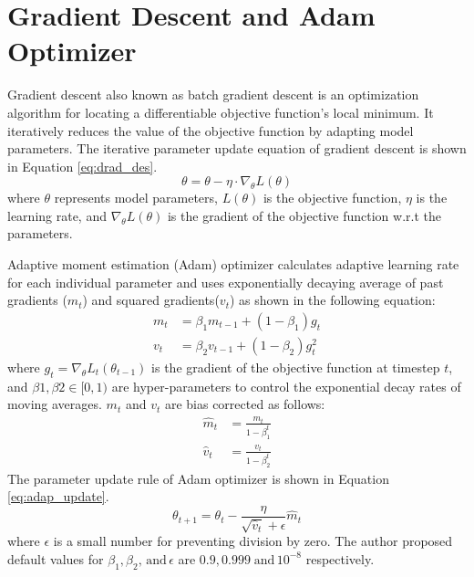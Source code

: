 \section{Gradient Descent and Adam Optimizer}\label{app:optimizer}
Gradient descent also known as batch gradient descent is an optimization algorithm for locating a differentiable objective function's local minimum. It iteratively reduces the value of the objective function by adapting model parameters. The iterative parameter update equation of gradient descent is shown in Equation \ref{eq:drad_des}.
\begin{equation}\label{eq:drad_des}
	\theta=\theta-\eta \cdot \nabla_\theta L(\theta)
\end{equation}
where $\theta$ represents model parameters, $L(\theta)$ is the objective function, $\eta$ is the learning rate, and $\nabla_\theta L(\theta)$ is the gradient of the objective function w.r.t the parameters. 

Adaptive moment estimation (Adam) optimizer \cite{Kingma2015} calculates adaptive learning rate for each individual parameter and uses exponentially decaying average of past gradients ($m_t$) and squared gradients($v_t$) as shown in the following equation:
\begin{equation}
	\begin{aligned}
		m_t & =\beta_1 m_{t-1}+\left(1-\beta_1\right) g_t \\
		v_t & =\beta_2 v_{t-1}+\left(1-\beta_2\right) g_t^2
	\end{aligned}
\end{equation}
where $g_t=\nabla_\theta L_t\left(\theta_{t-1}\right)$ is the gradient of the objective function at timestep $t$, and  $\beta 1, \beta 2 \in[0,1)$ are hyper-parameters to control the exponential decay rates of moving averages. $m_t$ and $v_t$ are bias corrected as follows:
\begin{equation}
	\begin{aligned}
		\hat{m}_t & =\frac{m_t}{1-\beta_1^t} \\
		\hat{v}_t & =\frac{v_t}{1-\beta_2^t}
	\end{aligned}
\end{equation}
The parameter update rule of Adam optimizer is shown in Equation \ref{eq:adap_update}.
\begin{equation}\label{eq:adap_update}
	\theta_{t+1}=\theta_t-\frac{\eta}{\sqrt{\hat{v}_t}+\epsilon} \hat{m}_t
\end{equation}
where $\epsilon$ is a small number for preventing division by zero. The author proposed default values for $\beta_1, \beta_2, \,\text{and}\, \epsilon$ are $0.9, 0.999 \;\text{and}\, 10^{-8}$ respectively.
